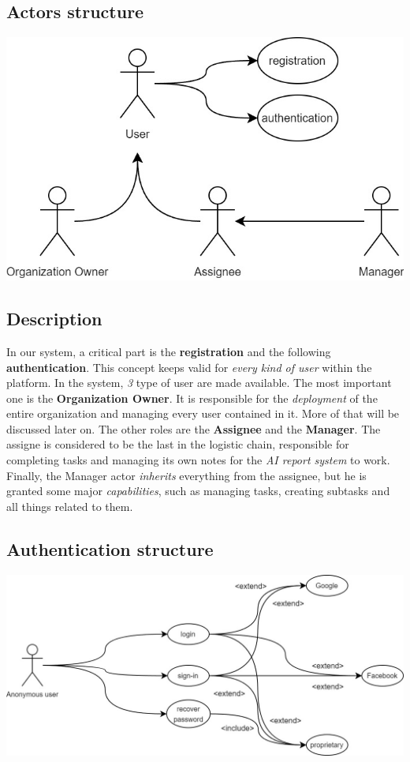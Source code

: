 \documentclass{article}
\begin{document}
\subsection{Actors structure}
\includegraphics[width=\textwidth, height=\textheight, keepaspectratio]{images/UseCaseDiagram/UseCaseUser.jpg}
\subsection*{Description}
In our system, a critical part is the \textbf{registration} and the following \textbf{authentication}. This concept keeps valid for \textit{every kind of user} within the platform.
In the system, \textit{3} type of user are made available.
The most important one is the \textbf{Organization Owner}. It is responsible for the \textit{deployment} of the entire organization and managing every user contained in it. More of that will be discussed later on.
The other roles are the \textbf{Assignee} and the \textbf{Manager}. The assigne is considered to be the last in the logistic chain, responsible for completing tasks and managing its own notes for the \textit{AI report system} to work.
Finally, the Manager actor \textit{inherits} everything from the assignee, but he is granted some major \textit{capabilities}, such as managing tasks, creating subtasks and all things related to them.
\subsection{Authentication structure}
\includegraphics[width=\textwidth, keepaspectratio]{images/UseCaseDiagram/UseCaseAuthentication.jpg}
\end{document}
